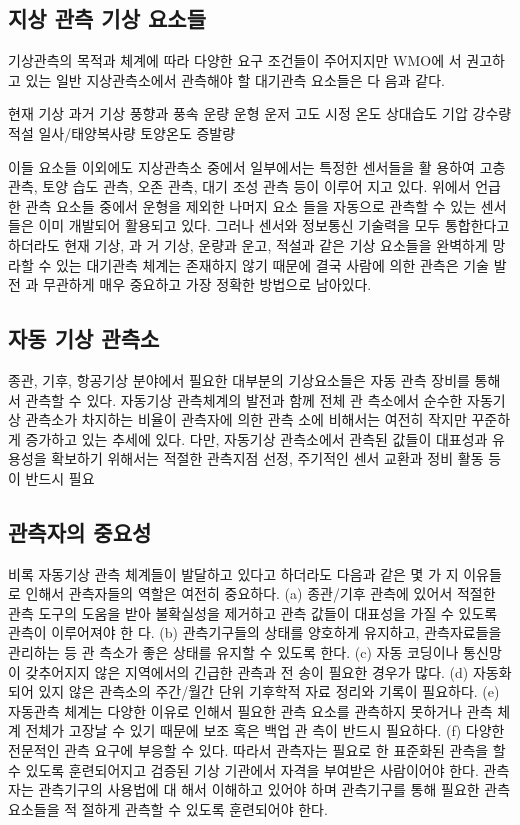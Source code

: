 \begin{itemize}
\subsection{지상 관측 기상 요소들}

기상관측의 목적과 체계에 따라 다양한 요구 조건들이 주어지지만 WMO에
서 권고하고 있는 일반 지상관측소에서 관측해야 할 대기관측 요소들은 다
음과 같다.

현재 기상
과거 기상
풍향과 풍속
운량
운형
운저 고도
시정
온도
상대습도
기압
강수량
적설
일사/태양복사량
토양온도
증발량

이들 요소들 이외에도 지상관측소 중에서 일부에서는 특정한 센서들을 활
용하여 고층 관측, 토양 습도 관측, 오존 관측, 대기 조성 관측 등이 이루어
지고 있다. 위에서 언급한 관측 요소들 중에서 운형을 제외한 나머지 요소
들을 자동으로 관측할 수 있는 센서들은 이미 개발되어 활용되고 있다.
그러나 센서와 정보통신 기술력을 모두 통합한다고 하더라도 현재 기상, 과
거 기상, 운량과 운고, 적설과 같은 기상 요소들을 완벽하게 망라할 수 있는
대기관측 체계는 존재하지 않기 때문에 결국 사람에 의한 관측은 기술 발전
과 무관하게 매우 중요하고 가장 정확한 방법으로 남아있다.

\subsection{자동 기상 관측소}

종관, 기후, 항공기상 분야에서 필요한 대부분의 기상요소들은 자동 관측
장비를 통해서 관측할 수 있다. 자동기상 관측체계의 발전과 함께 전체 관
측소에서 순수한 자동기상 관측소가 차지하는 비율이 관측자에 의한 관측
소에 비해서는 여전히 작지만 꾸준하게 증가하고 있는 추세에 있다. 다만,
자동기상 관측소에서 관측된 값들이 대표성과 유용성을 확보하기 위해서는
적절한 관측지점 선정, 주기적인 센서 교환과 정비 활동 등이 반드시 필요

\subsection{관측자의 중요성}
비록 자동기상 관측 체계들이 발달하고 있다고 하더라도 다음과 같은 몇 가
지 이유들로 인해서 관측자들의 역할은 여전히 중요하다.
(a) 종관/기후 관측에 있어서 적절한 관측 도구의 도움을 받아 불확실성을
제거하고 관측 값들이 대표성을 가질 수 있도록 관측이 이루어져야 한
다.
(b) 관측기구들의 상태를 양호하게 유지하고, 관측자료들을 관리하는 등 관
측소가 좋은 상태를 유지할 수 있도록 한다.
(c) 자동 코딩이나 통신망이 갖추어지지 않은 지역에서의 긴급한 관측과 전
송이 필요한 경우가 많다.
(d) 자동화되어 있지 않은 관측소의 주간/월간 단위 기후학적 자료 정리와
기록이 필요하다.
(e) 자동관측 체계는 다양한 이유로 인해서 필요한 관측 요소를 관측하지
못하거나 관측 체계 전체가 고장날 수 있기 때문에 보조 혹은 백업 관
측이 반드시 필요하다.
(f) 다양한 전문적인 관측 요구에 부응할 수 있다. 따라서 관측자는 필요로
한 표준화된 관측을 할 수 있도록 훈련되어지고 검증된 기상 기관에서
자격을 부여받은 사람이어야 한다. 관측자는 관측기구의 사용법에 대
해서 이해하고 있어야 하며 관측기구를 통해 필요한 관측 요소들을 적
절하게 관측할 수 있도록 훈련되어야 한다.


\end{itemize}
